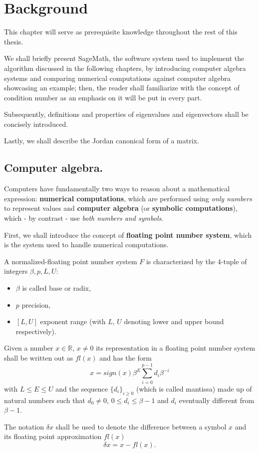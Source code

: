 \section{Background}
This chapter will serve as prerequisite knowledge throughout the rest of this thesis.

We shall briefly present SageMath, the software system used to implement the algorithm discussed in the following chapters,
by introducing computer algebra systems and comparing numerical computations against computer algebra showcasing an
example; then, the reader shall familiarize with the concept of condition number as an emphasis on it will be put in
every part.

Subsequently, definitions and properties of eigenvalues and eigenvectors shall be concisely introduced.

Lastly, we shall describe the Jordan canonical form of a matrix.

\subsection*{Computer algebra.}
Computers have fundamentally two ways to reason about a mathematical expression: \textbf{numerical computations}, which are
performed using \textit{only numbers} to represent values and \textbf{computer algebra} (or \textbf{symbolic computations}),
which - by contrast - use \textit{both numbers and symbols}.

First, we shall introduce the concept of \textbf{floating point number system}, which is the system used to handle numerical
computations.
\begin{definition}
    A normalized-floating point number system \(F\) is characterized by the 4-tuple of integers \(\beta, p, L, U\):
    \begin{itemize}[topsep=0pt, itemsep=0pt, parsep=0pt]
        \item \(\beta\) is called base or radix,
        \item \(p\) precision,
        \item \([L, U]\) exponent range (with \(L\), \(U\) denoting lower and upper bound respectively).
    \end{itemize}
    Given a number \(x \in \mathbb{R}\), \(x \neq 0\) its representation in a floating point number system shall be written
    out as \(fl(x)\) and has the form
    \[x = sign(x) \beta^E \sum_{i=0}^{p-1}d_{i}\beta^{-i}\]
    with \(L \leq E \leq U\) and the sequence \(\{d_{i}\}_{i \geq 0}\) (which is called mantissa) made up of
    natural numbers such that \(d_{0} \neq 0\), \(0 \leq d_{i} \leq \beta - 1\) and \(d_{i}\)
    eventually different from \(\beta - 1\).

    The notation \(\delta x\) shall be used to denote the difference between a symbol \(x\) and its floating point
    approximation \(fl(x)\)
    \[
        \delta x = x - fl(x).
    \]
\end{definition}

